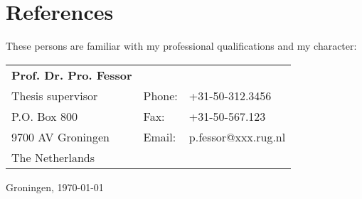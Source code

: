 \documentclass[a4paper]{article}
\begin{document}
\pagebreak

\section{References}

\noindent These persons are familiar with my professional qualifications and my character:

\begin{table}[h]
\begin{tabular}{@{}lll@{}}
\textbf{Prof. Dr. Pro. Fessor} \\
Thesis supervisor & Phone: & +31-50-312.3456\\
P.O. Box 800 & Fax: & +31-50-567.123\\
9700 AV Groningen & Email: & p.fessor@xxx.rug.nl \\
The Netherlands \\
\end{tabular}
\end{table}

\vspace{2\baselineskip}
\noindent Groningen, \today
\end{document}
